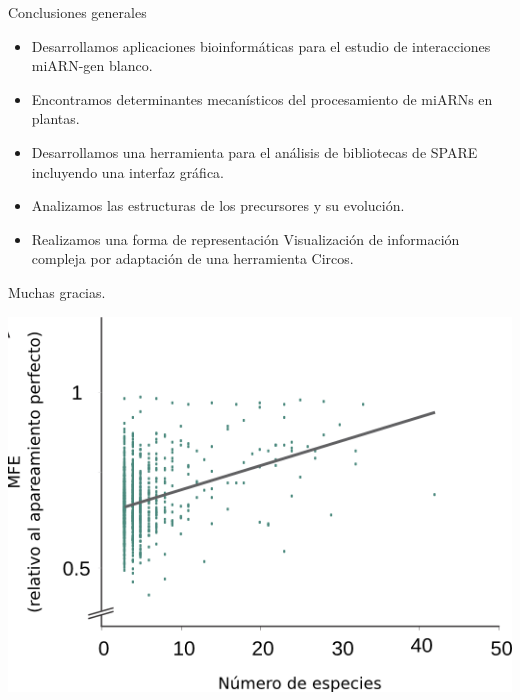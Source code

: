 \documentclass{beamer}
\begin{document}
\begin{frame}{Conclusiones generales}
	\begin{itemize}
        \item<1-> Desarrollamos aplicaciones bioinformáticas para el estudio de interacciones miARN-gen blanco.
        \item<2-> Encontramos determinantes mecanísticos del procesamiento de miARNs en plantas.
        \item<3-> Desarrollamos una herramienta para el análisis de bibliotecas de SPARE incluyendo una interfaz gráfica.
        \item<4-> Analizamos las estructuras de los precursores y su evolución.
        \item<5-> Realizamos una forma de representación Visualización de información compleja por adaptación de una herramienta Circos.
    \end{itemize}
\end{frame}


\begin{frame}{}
	\begin{center}
		\Huge Muchas gracias.
	\end{center}
\end{frame}

\begin{frame}{}
	\begin{center}
	\end{center}
\end{frame}

\begin{frame}{}
	\begin{center}
		\includegraphics[width=.5\textwidth]{img/extras/NAR_fig3A.png}
	\end{center}
\end{frame}
\end{document}
